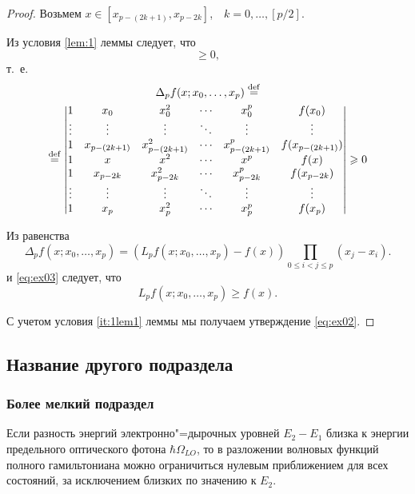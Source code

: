 \documentclass[bachelor, och, coursework]{SCWorks}
\newcommand{\eqdef}{\stackrel {\rm def}{=}}
\begin{document}
\begin{proof}
    Возьмем $x \in [x_{p-(2k+1)},x_{p-2k}]$,\ \ $k=0,\ldots,\left[p/2
    \right]$.

    Из условия \ref{lem:1} леммы следует, что
    \begin{displaymath}
        [x_0,\ldots,x_{p-(2k+1)},x,x_{p-2k},\ldots,x_p;f] \geqslant
        0,
    \end{displaymath}
    т.~е.
    \begin{multline}\label{eq:ex03}
     \Delta_pf(x;x_0,\ldots,x_p)\eqdef
     \\ \eqdef
      \begin{vmatrix}
       1 & x_0   & x_0^2 & \cdots & x_0^p & f(x_0) \\
       \vdots  & \vdots & \vdots & \ddots & \vdots & \vdots \\
       1 & x_{p-(2k+1)} & x_{p-(2k+1)}^2 & \cdots & x_{p-(2k+1)}^p & f(x_{p-(2k+1)}) \\
       1 & x & x^2 & \cdots & x^p & f(x) \\
       1 & x_{p-2k} & x_{p-2k}^2 & \cdots & x_{p-2k}^p & f(x_{p-2k}) \\
       \vdots  & \vdots & \vdots & \ddots & \vdots & \vdots \\
       1 & x_p & x_p^2 & \cdots & x_p^p & f(x_p) \\
      \end{vmatrix}
      \geqslant 0
    \end{multline}

    Из равенства
    \begin{equation*}
        \Delta_p f(x;x_0,\ldots,x_p)=(L_pf(x;x_0,\ldots,x_p)-f(x))
        \prod_{0\leqslant i<j\leqslant p}(x_j-x_i).
    \end{equation*}
	и \eqref{eq:ex03} следует, что
    \begin{displaymath}
        L_pf(x;x_0,\ldots,x_p)\geqslant f(x).
    \end{displaymath}

    С учетом условия \ref{it:1lem1} леммы мы получаем утверждение \eqref{eq:ex02}.
\end{proof}

\subsection{Название другого подраздела}
\subsubsection{Более мелкий подраздел}
Если разность энергий электронно"=дырочных уровней $E_2-E_1$ близка к энергии предельного оптического фотона $\hbar\Omega_{LO}$, то в разложении волновых функций полного гамильтониана можно ограничиться нулевым приближением для всех состояний, за исключением близких по значению к $E_2$.
\end{document}
